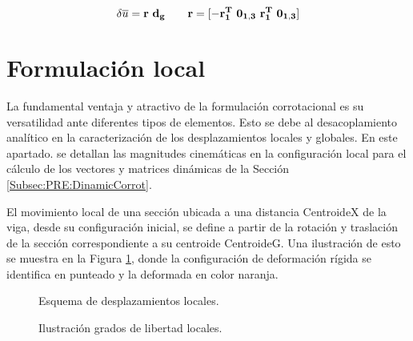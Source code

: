 \begin{equation}\label{eq:PRE:DefincionR}
\delta \overline{u} = \bf{r}~ d_g ~~~~~~\bf{r} = [ -\bf{r}_1^T~ \bf{0}_{1,3}~ \bf{r}_1^T~ \bf{0}_{1,3}  ]
\end{equation}

\section{Formulación local}\label{Sec:PRE:LocalFormul}
La fundamental ventaja y atractivo de la formulación corrotacional es su versatilidad ante diferentes tipos de elementos. Esto se debe al desacoplamiento analítico en la caracterización de los desplazamientos locales y globales. En este apartado. se detallan las magnitudes cinemáticas en la configuración local para el cálculo de los vectores y matrices dinámicas de la Sección \ref{Subsec:PRE:DinamicCorrot}.

El movimiento local de una sección ubicada a una distancia \gls{CentroideX} de la viga, desde su configuración inicial, se define a partir de la rotación y traslación de la sección correspondiente a su centroide \gls{CentroideG}. Una ilustración de esto se muestra en la Figura \ref{fig:PRE:IlusLocalDisp}, donde la configuración de deformación rígida se identifica en punteado y la deformada en color naranja.



\begin{figure}[htbp]
	\centering
	\def\svgwidth{100mm}
	
	\caption{Esquema de desplazamientos locales.}
	\label{fig:PRE:IlusLocalDisp}
\end{figure}

\begin{figure}[htbp]
	\centering
	\def\svgwidth{100mm}
 	
	\caption{Ilustración grados de libertad locales.}
	\label{fig:PRE:IlusLocalAng}
\end{figure}




